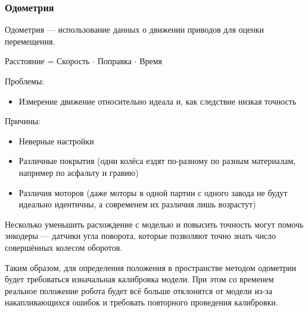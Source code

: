 \documentclass{article}
\begin{document}
\begin{sloppypar}
    \subsubsection{Одометрия}
    Одометрия — использование данных о движении приводов для оценки перемещения.

    Расстояние = Скорость $\cdot$ Поправка $\cdot$ Время

    Проблемы:
    \begin{itemize}
        \item Измерение движение относительно идеала и, как следствие низкая точность
    \end{itemize}

    Причины:
    \begin{itemize}
        \item Неверные настройки
        \item Различные покрытия (одни колёса ездят по-разному по разным материалам, например по асфальту и гравию)
        \item Различия моторов (даже моторы в одной партии с одного завода не будут идеально идентичны, а современем их различия лишь возрастут)
    \end{itemize}

    Несколько уменьшить расхождение с моделью и повысить точность могут помочь энкодеры — датчики угла поворота, которые позволяют точно знать число совершённых колесом оборотов.

    Таким образом, для определения положения в пространстве методом одометрии будет требоваться изначальная калибровка модели. При этом со временем реальное положение робота будет всё больше отклонятся от модели из-за накапливающихся ошибок и требовать повторного проведения калибровки.
\end{sloppypar}
\end{document}
